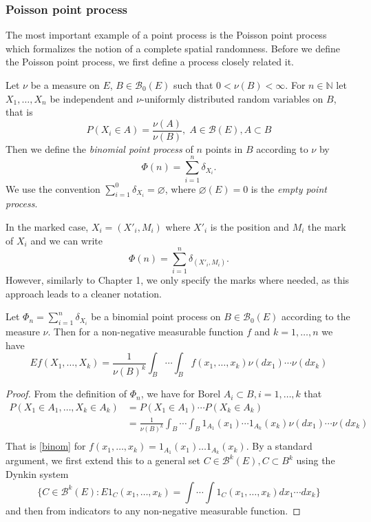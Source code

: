 \subsubsection{Poisson point process}
The most important example of a point process is the Poisson point process which formalizes the notion of a complete spatial randomness. Before we define the Poisson point process, we first define a process closely related it.

\begin{definition} Let $\nu$ be a measure on $E$, $B \in \mathcal B_0(E)$ such that $0<\nu(B)<\infty$. For $n\in \mathbb N$ let $X_1,\dots,X_n$ be independent and $\nu$-uniformly distributed random variables on $B$, that is
	$$P(X_i \in A) = \frac{\nu(A)}{\nu(B)},\; A\in\mathcal B(E), A \subset B$$
Then we define the \textit{binomial point process} of $n$ points in $B$ according to $\nu$ by 
$$\Phi(n) = \sum^{n}_{i=1}  \delta_{X_i}.$$
We use the convention $\sum^0_{i=1} \delta_{X_i} = \varnothing$, where $\varnothing(E)=0$ is the \textit{empty point process}.
\end{definition}
In the marked case, $X_i=(X'_i,M_i)$ where $X'_i$ is the position and $M_i$ the mark of $X_i$ and we can write
$$\Phi(n) = \sum^{n}_{i=1} \delta_{(X'_i,M_i)}.$$
However, similarly to Chapter 1, we only specify the marks where needed, as this approach leads to a cleaner notation. 

\begin{proposition}\label{bincalc}
	Let $\Phi_n = \sum^{n}_{i=1}  \delta_{X_i}$ be a binomial point process on $B\in\mathcal B_0(E)$ according to the measure $\nu$. Then for a non-negative measurable function $f$ and $k = 1,\dots, n$ we have
\begin{equation}\label{binom}
	Ef(X_1,\dots, X_k) = \frac 1{\nu(B)^k} \int_B \cdots \int_B f(x_1,\dots, x_k) \nu(dx_1) \cdots \nu(dx_k)
\end{equation}
\end{proposition}
\begin{proof}
From the definition of $\Phi_n$, we have for Borel $A_i \subset B, i=1,\dots,k$ that
\begin{align*}
P(X_1 \in A_1, \dots, X_k \in A_k) &= P(X_1\in A_1)\cdots P(X_k\in A_k) \\ 
& = \frac 1{\nu(B)^k} \int_B \cdots \int_B 1_{A_1}(x_1) \cdots 1_{A_k}(x_k) \nu(dx_1) \cdots \nu(dx_k) \\
\end{align*}
That is \eqref{binom} for $f(x_1,\dots,x_k)=1_{A_1}(x_1)\dots 1_{A_k}(x_k)$. By a standard argument, we first extend this to a general set $C \in \mathcal B^k(E), C\subset B^k$ using the Dynkin system 
$$\{C \in \mathcal B^k(E): E 1_C (x_1,\dots,x_k) = \int \cdots \int 1_C(x_1,\dots, x_k) dx_1 \cdots dx_k \}$$
 and then from indicators to any non-negative measurable function.
\end{proof}



